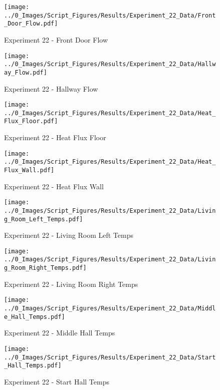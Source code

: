 	\begin{figure}[H]
		\centering
		\texttt{[image: ../0\_Images/Script\_Figures/Results/Experiment\_22\_Data/Front\_Door\_Flow.pdf]}
		\caption[]{Experiment 22 - Front Door Flow}
	\end{figure}
 
	\clearpage

	\begin{figure}[H]
		\centering
		\texttt{[image: ../0\_Images/Script\_Figures/Results/Experiment\_22\_Data/Hallway\_Flow.pdf]}
		\caption[]{Experiment 22 - Hallway Flow}
	\end{figure}
 

	\begin{figure}[H]
		\centering
		\texttt{[image: ../0\_Images/Script\_Figures/Results/Experiment\_22\_Data/Heat\_Flux\_Floor.pdf]}
		\caption[]{Experiment 22 - Heat Flux Floor}
	\end{figure}
 
	\clearpage

	\begin{figure}[H]
		\centering
		\texttt{[image: ../0\_Images/Script\_Figures/Results/Experiment\_22\_Data/Heat\_Flux\_Wall.pdf]}
		\caption[]{Experiment 22 - Heat Flux Wall}
	\end{figure}
 

	\begin{figure}[H]
		\centering
		\texttt{[image: ../0\_Images/Script\_Figures/Results/Experiment\_22\_Data/Living\_Room\_Left\_Temps.pdf]}
		\caption[]{Experiment 22 - Living Room Left Temps}
	\end{figure}
 
	\clearpage

	\begin{figure}[H]
		\centering
		\texttt{[image: ../0\_Images/Script\_Figures/Results/Experiment\_22\_Data/Living\_Room\_Right\_Temps.pdf]}
		\caption[]{Experiment 22 - Living Room Right Temps}
	\end{figure}
 

	\begin{figure}[H]
		\centering
		\texttt{[image: ../0\_Images/Script\_Figures/Results/Experiment\_22\_Data/Middle\_Hall\_Temps.pdf]}
		\caption[]{Experiment 22 - Middle Hall Temps}
	\end{figure}
 
	\clearpage

	\begin{figure}[H]
		\centering
		\texttt{[image: ../0\_Images/Script\_Figures/Results/Experiment\_22\_Data/Start\_Hall\_Temps.pdf]}
		\caption[]{Experiment 22 - Start Hall Temps}
	\end{figure}
 

